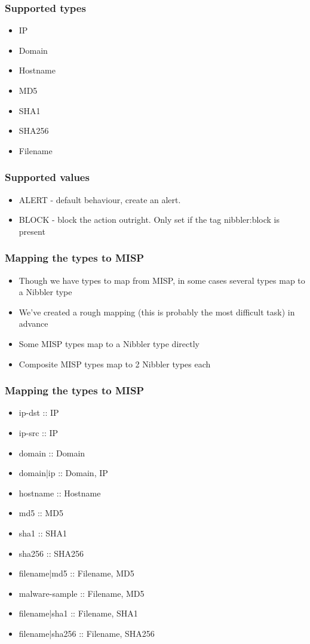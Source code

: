 \begin{frame}
  \frametitle{Supported types}
  \begin{itemize}
    \item IP
    \item Domain
    \item Hostname
    \item MD5
    \item SHA1
    \item SHA256
    \item Filename
  \end{itemize}
\end{frame}

\begin{frame}
  \frametitle{Supported values}
  \begin{itemize}
    \item ALERT - default behaviour, create an alert.
    \item BLOCK - block the action outright. Only set if the tag nibbler:block is present
  \end{itemize}
\end{frame}

\begin{frame}
  \frametitle{Mapping the types to MISP}
  \begin{itemize}
    \item Though we have types to map from MISP, in some cases several types map to a Nibbler type
    \item We've created a rough mapping (this is probably the most difficult task) in advance
    \item Some MISP types map to a Nibbler type directly
    \item Composite MISP types map to 2 Nibbler types each
  \end{itemize}
\end{frame}

\begin{frame}
  \frametitle{Mapping the types to MISP}
  \begin{itemize}
    \item ip-dst :: IP
    \item ip-src :: IP
    \item domain :: Domain
    \item domain|ip :: Domain, IP
    \item hostname :: Hostname
    \item md5 :: MD5
    \item sha1 :: SHA1
    \item sha256 :: SHA256
    \item filename|md5 :: Filename, MD5
    \item malware-sample :: Filename, MD5
    \item filename|sha1 :: Filename, SHA1
    \item filename|sha256 :: Filename, SHA256
  \end{itemize}
\end{frame}

